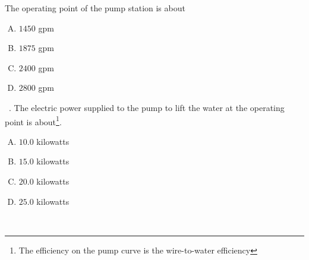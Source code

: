 \documentclass[12 pt]{article}
\begin{document}
The operating point of the pump station is about
\begin{enumerate}[(A)]
\item $1450$ gpm
\item $1875$ gpm
\item $2400$ gpm
\item $2800$ gpm
\end{enumerate}
~. The electric power supplied to the pump to lift the water at the operating point is about\footnote{The efficiency on the pump curve is the wire-to-water efficiency}.
\begin{enumerate}[(A)]
\item $10.0$ kilowatts
\item $15.0$ kilowatts
\item $20.0$ kilowatts
\item $25.0$ kilowatts
\end{enumerate}
~\newline
\end{document}
